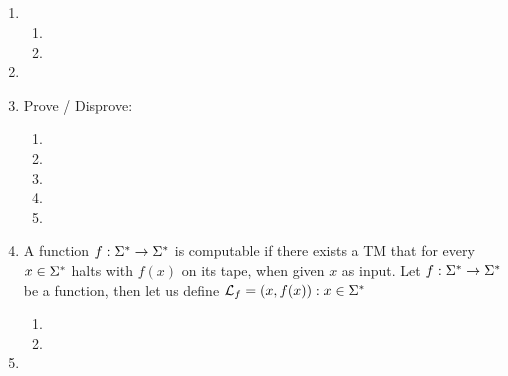 \documentclass{article}
\title{
    \textmd{\bd{\hmwkClass:\ \hmwkTitle}}\\
}
\author{\hmwkAuthorName}
\begin{document}
\maketitle

\begin{enumerate}
      \item
            \begin{enumerate}
                  \item 
                        \pagebreak

                  \item 
            \end{enumerate}

            \pagebreak

      \item 

            \pagebreak

      \item Prove / Disprove:
            \begin{enumerate}
                  \item 
                  \item 
                        \pagebreak

                  \item 
                        \pagebreak

                  \item 
                        \pagebreak

                  \item 
            \end{enumerate}

            \pagebreak

      \item A function $f : \Sigma^* \rightarrow \Sigma^*$ is computable if there exists a TM that for every
            $x \in \Sigma^*$ halts with $f(x)$ on its tape, when given $x$ as input.
            Let $f : \Sigma^* \rightarrow \Sigma^*$ be a function, then let us define $\mathcal{L}_f = {(x, f(x)) : x \in \Sigma^*}$
            \begin{enumerate}
                  \item 
                  \item 
            \end{enumerate}

            \pagebreak

      \item 

\end{enumerate}
\end{document}
